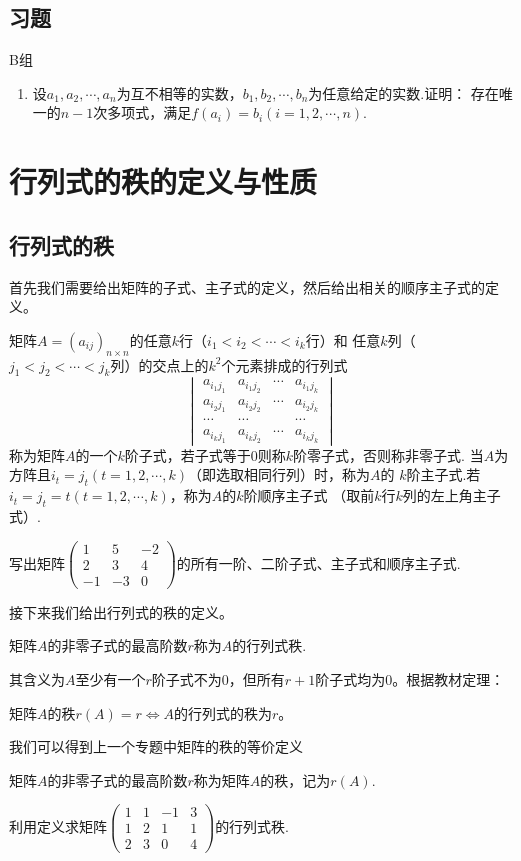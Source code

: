 \subsection{习题}
\centerline{\heiti B组}
\begin{enumerate}
	\item 设$a_1,a_2,\cdots,a_n$为互不相等的实数，$b_1,b_2,\cdots,b_n$为任意给定的实数.证明：
	存在唯一的$n-1$次多项式，满足$f(a_i)=b_i(i=1,2,\cdots,n)$.
\end{enumerate}

\section{行列式的秩的定义与性质}
\subsection{行列式的秩}
首先我们需要给出矩阵的子式、主子式的定义，然后给出相关的顺序主子式的定义。
\begin{definition}
	矩阵$A=(a_{ij})_{n \times n}$的任意$k$行（$i_1<i_2<\cdots<i_k$行）和
	任意$k$列（$j_1<j_2<\cdots<j_k$列）的交点上的$k^2$个元素排成的行列式
	$$\begin{vmatrix}
		a_{i_1j_1} & a_{i_1j_2} & \cdots & a_{i_1j_k} \\
		a_{i_2j_1} & a_{i_2j_2} & \cdots & a_{i_2j_k} \\
		\cdots & \cdots &  & \cdots \\
		a_{i_kj_1} & a_{i_kj_2} & \cdots & a_{i_kj_k}
	\end{vmatrix}$$
	称为矩阵$A$的一个$k$阶子式，若子式等于$0$则称$k$阶零子式，否则称非零子式.
	当$A$为方阵且$i_t=j_t(t=1,2,\cdots,k)$（即选取相同行列）时，称为$A$的
	$k$阶主子式.若$i_t=j_t=t(t=1,2,\cdots,k)$，称为$A$的$k$阶顺序主子式
	（取前$k$行$k$列的左上角主子式）.
\end{definition}
\begin{example}
	写出矩阵$\begin{pmatrix}
		1 & 5 & -2 \\ 2 & 3 & 4 \\ -1 & -3 & 0
	\end{pmatrix}$的所有一阶、二阶子式、主子式和顺序主子式.
\end{example}
接下来我们给出行列式的秩的定义。
\begin{definition}
	矩阵$A$的非零子式的最高阶数$r$称为$A$的行列式秩.
\end{definition}
\raggedright 其含义为$A$至少有一个$r$阶子式不为0，但所有$r+1$阶子式均为0。根据教材定理：
\begin{theorem}
	矩阵$A$的秩$r(A)=r \iff A$的行列式的秩为$r$。
\end{theorem}
\raggedright 我们可以得到上一个专题中矩阵的秩的等价定义
\begin{definition}
	矩阵$A$的非零子式的最高阶数$r$称为矩阵$A$的秩，记为$r(A)$.
\end{definition}
\begin{example}
	利用定义求矩阵$\begin{pmatrix}
		1 & 1 & -1 & 3 \\ 1 & 2 & 1 & 1 \\ 2 & 3 & 0 & 4
	\end{pmatrix}$的行列式秩.
\end{example}
